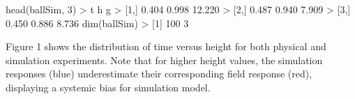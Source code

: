 \documentclass[
]{article}
\newenvironment{Shaded}{\begin{snugshade}}{\end{snugshade}}
\newcommand{\DecValTok}[1]{\textcolor[rgb]{0.00,0.00,0.81}{#1}}
\newcommand{\FloatTok}[1]{\textcolor[rgb]{0.00,0.00,0.81}{#1}}
\newcommand{\FunctionTok}[1]{\textcolor[rgb]{0.00,0.00,0.00}{#1}}
\newcommand{\NormalTok}[1]{#1}
\newcommand{\SpecialCharTok}[1]{\textcolor[rgb]{0.00,0.00,0.00}{#1}}
\begin{document}
\begin{Shaded}
\begin{Highlighting}[]
\FunctionTok{head}\NormalTok{(ballSim, }\DecValTok{3}\NormalTok{)}
\SpecialCharTok{\textgreater{}}\NormalTok{          t     h      g}
\SpecialCharTok{\textgreater{}}\NormalTok{ [}\DecValTok{1}\NormalTok{,] }\FloatTok{0.404} \FloatTok{0.998} \FloatTok{12.220}
\SpecialCharTok{\textgreater{}}\NormalTok{ [}\DecValTok{2}\NormalTok{,] }\FloatTok{0.487} \FloatTok{0.940}  \FloatTok{7.909}
\SpecialCharTok{\textgreater{}}\NormalTok{ [}\DecValTok{3}\NormalTok{,] }\FloatTok{0.450} \FloatTok{0.886}  \FloatTok{8.736}
\FunctionTok{dim}\NormalTok{(ballSim)}
\SpecialCharTok{\textgreater{}}\NormalTok{ [}\DecValTok{1}\NormalTok{] }\DecValTok{100}   \DecValTok{3}
\end{Highlighting}
\end{Shaded}

Figure 1 shows the distribution of time versus height for both physical
and simulation experiments. Note that for higher height values, the
simulation responses (blue) underestimate their corresponding field
response (red), displaying a systemic bias for simulation model.

\pagebreak
\end{document}
